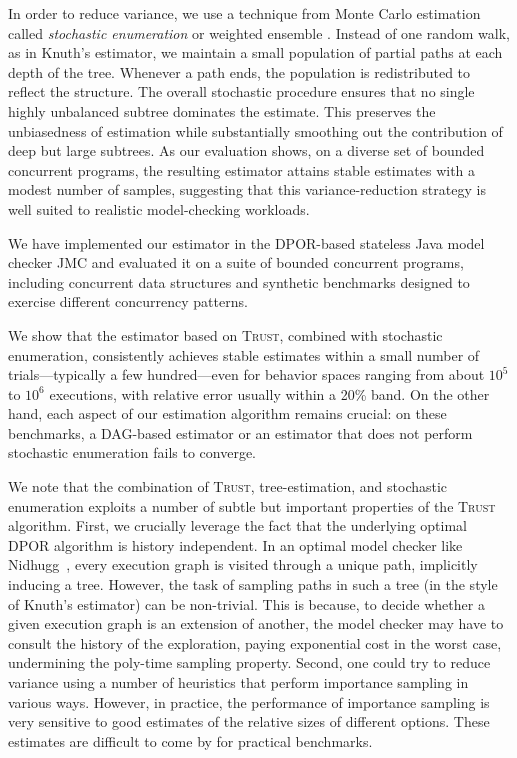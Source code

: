 \documentclass[acmsmall]{acmart}
\newcommand{\trust}{\textsc{Trust}\xspace}
\newcommand{\dpor}{\textsc{DPOR}\xspace}
\begin{document}
In order to reduce variance, we use a technique from Monte Carlo estimation called \emph{stochastic enumeration} \cite{rubinstein, vaisman2017} or weighted ensemble \cite{huberkim}.
Instead of one random walk, as in Knuth's estimator, we maintain a small population of partial paths at each depth of the tree.
Whenever a path ends, the population is redistributed to reflect the structure.
The overall stochastic procedure ensures that no single highly unbalanced subtree dominates the
estimate.
This preserves the unbiasedness of estimation while substantially smoothing out the contribution
of deep but large subtrees.
As our evaluation shows, on a diverse set of bounded concurrent programs, the
resulting estimator attains stable estimates with a modest number of samples,
suggesting that this variance-reduction strategy is well suited to realistic
model-checking workloads.

We have implemented our estimator in the \dpor-based stateless Java model checker JMC and evaluated it on a suite of bounded concurrent programs, including concurrent data structures 
and synthetic benchmarks designed to exercise different concurrency patterns.

We show that the estimator based on \trust, combined with stochastic enumeration, consistently achieves stable estimates within a small number of trials---typically a few hundred---even 
for behavior spaces ranging from about \(10^{5}\) to \(10^{6}\)
executions, with relative error usually within a 20\% band.
On the other hand, each aspect of our estimation algorithm remains 
crucial: on these benchmarks, a DAG-based estimator or an estimator that does not perform stochastic enumeration fails to converge.

We note that the combination of \trust, tree-estimation, and stochastic enumeration exploits a number of subtle but important properties of the \trust algorithm.
First, we crucially leverage the fact that the underlying optimal \dpor algorithm is history independent.
In an optimal model checker like Nidhugg~\cite{nidhugg}, every execution graph is visited through a unique path, implicitly inducing a tree.
However, the task of sampling paths in such a tree (in the style of Knuth's estimator) can be non-trivial.
This is because, to decide whether a given execution graph is an extension of another, the model checker may have to consult the history of the exploration, 
 paying exponential cost in the worst case, undermining the poly-time sampling property.
Second, one could try to reduce variance using a number of heuristics that perform importance sampling in various ways.
However, in practice, the performance of importance sampling is very sensitive to good estimates of the relative sizes of different options.
These estimates are difficult to come by for practical benchmarks.
\end{document}
